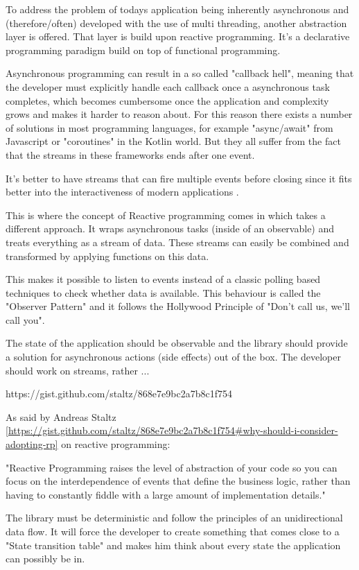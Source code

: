 To address the problem of todays application being inherently asynchronous and (therefore/often) developed 
with the use of multi threading, another abstraction layer is offered.
That layer is build upon reactive programming. It's a declarative programming paradigm
build on top of functional programming.

Asynchronous programming can result in a so called "callback hell", meaning that the developer must
explicitly handle each callback once a asynchronous task completes, which becomes cumbersome once the application 
and complexity grows and makes it harder to reason about. For this reason there exists a number of solutions
in most programming languages, for example "async/await" from Javascript or "coroutines" in the Kotlin world. 
But they all suffer from the fact that the streams in these frameworks ends after one event.

It's better to have streams that can fire multiple events before closing since it fits better into the
interactiveness of modern applications .

This is where the concept of Reactive programming comes in which takes a different approach. 
It wraps asynchronous tasks (inside of an observable) and treats everything as a stream of data.
These streams can easily be combined and transformed by applying functions on this data.

This makes it possible to listen to events instead of a classic polling based techniques to check
whether data is available. This behaviour is called the "Observer Pattern" and it follows the Hollywood Principle 
of "Don't call us, we'll call you".

The state of the application should be observable and the library should provide
a solution for asynchronous actions (side effects) out of the box. The developer
should work on streams, rather ...

https://gist.github.com/staltz/868e7e9bc2a7b8c1f754

As said by Andreas Staltz \ref{https://gist.github.com/staltz/868e7e9bc2a7b8c1f754#why-should-i-consider-adopting-rp} on
reactive programming:

"Reactive Programming raises the level of abstraction of your code so you can 
focus on the interdependence of events that define the business logic, 
rather than having to constantly fiddle with a large amount of implementation details."

The library must be deterministic and follow the principles of an unidirectional data flow. 
It will force the developer to create something that comes close to a "State transition table" and makes him 
think about every state the application can possibly be in.



